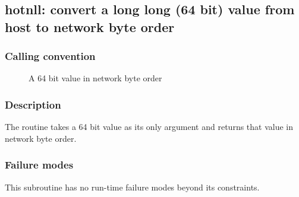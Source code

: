 \clearpage
{}
{}
\label{subr:htonll}
\subsection*{hotnll: convert a long long (64 bit) value from host to  network byte order}

\subsubsection*{Calling convention}

\begin{description}
\item[] A 64 bit value in network byte order
\end{description}

\subsubsection*{Description}

The  routine takes a 64 bit value as its only
argument and returns that value in network byte order.

\subsubsection*{Failure modes}

This subroutine has no run-time failure modes beyond its constraints.

